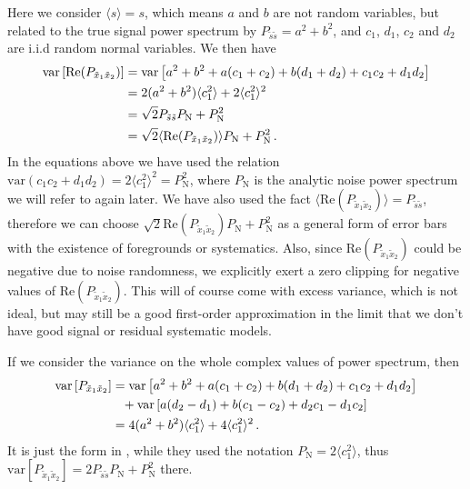 \documentclass[12pt,a4paper]{article}
\begin{document}
Here we consider $\langle s \rangle = s$, which means $a$ and $b$ are not random variables, but related to the true signal power spectrum by $P_{\tilde{s}\tilde{s}} = a^2 +b^2$, and $c_1$, $d_1$, $c_2$ and $d_2$ are i.i.d random normal variables. We then have 
\begin{align}
\label{eq:var_real_ps}
\text{var} \left[\text{Re} (P_{\tilde{x}_1\tilde{x}_2}) \right] &= \text{var} \left[a^2+b^2 + a(c_1+c_2) + b(d_1+d_2) + c_1c_2 + d_1d_2 \right] \notag \\
& = 2(a^2+b^2)\langle c_1^2\rangle + 2\langle c_1^2\rangle^2 \notag \\
& = \sqrt{2}P_{\tilde{s}\tilde{s}}P_\text{N} + P_\text{N}^2 \notag \\
& = \sqrt{2}\langle \text{Re} (P_{\tilde{x}_1\tilde{x}_2})\rangle P_\text{N} + P_\text{N}^2 \,.
\end{align}
In the equations above we have used the relation $\text{var} ( c_1c_2 + d_1d_2) = 2\langle c_1^2\rangle^2 = P_\text{N}^2$, where $P_\text{N}$ is the analytic noise power spectrum we will refer to again later. We have also used the fact $\langle \text{Re} (P_{\tilde{x}_1\tilde{x}_2})\rangle = P_{\tilde{s}\tilde{s}}$, therefore we can choose $\sqrt{2}\text{Re} (P_{\tilde{x}_1\tilde{x}_2}) P_\text{N} + P_\text{N}^2$ as a general form of error bars with the existence of foregrounds or systematics. Also, since $\text{Re} (P_{\tilde{x}_1\tilde{x}_2})$ could be negative due to noise randomness, we explicitly exert a zero clipping for negative values of $\text{Re} (P_{\tilde{x}_1\tilde{x}_2})$. This will of course come with excess variance, which is not ideal, but may still be a good first-order approximation in the limit that we don't have good signal or residual systematic models.   

If we consider the variance on the whole complex values of power spectrum, then 
\begin{align}
\label{eq:var_ps}
\text{var} \left[P_{\tilde{x}_1\tilde{x}_2} \right] &= \text{var} \left[a^2+b^2 + a(c_1+c_2) + b(d_1+d_2) + c_1c_2 + d_1d_2 \right] \notag \\
&\phantom{=} +  \text{var} \left[a(d_2-d_1)+b(c_1-c_2)+d_2 c_1-d_1 c_2 \right] \notag \\
& = 4(a^2+b^2)\langle c_1^2\rangle + 4\langle c_1^2\rangle^2 \,.
\end{align}
It is just the form in \citet{kolopanis2019simplified}, while they used the notation $P_\text{N} = 2\langle c_1^2\rangle$, thus $\text{var} \left[P_{\tilde{x}_1\tilde{x}_2} \right] = 2 P_{\tilde{s}\tilde{s}} P_\text{N} + P_\text{N}^2$ there. 
\end{document}
